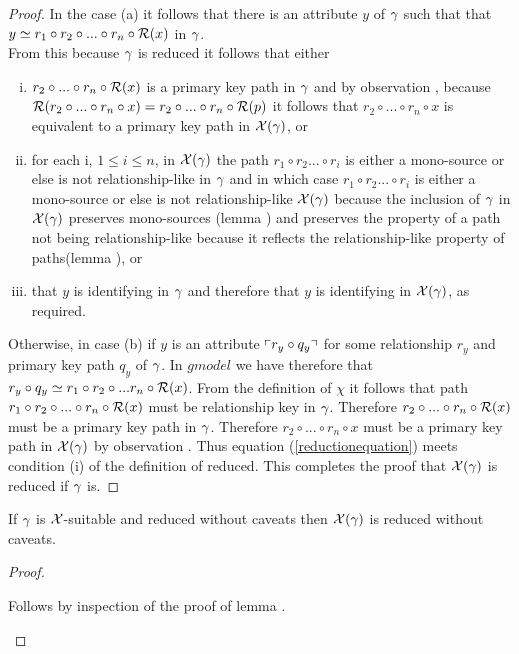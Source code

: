 \begin{proof}
In the case (a) it follows that there is an  attribute $y$ of $\gamma$ such that
that $y \simeq r_1 \circ r_2 \circ ... \circ r_n \circ \mathcal{R}(x)$ in $\gamma$. \\

From this because $\gamma$ is reduced it follows that either  
\begin{enumerate}[(i)]
\item $r_2 \circ ... \circ r_n \circ \mathcal{R}(x)$ is a primary key path in $\gamma$ and by observation , because $\mathcal{R}(r_2 \circ ... \circ r_n \circ x) = r_2 \circ ... \circ r_n \circ \mathcal{R}(p)$ it follows that $r_2 \circ ... \circ r_n \circ x$ is equivalent to a primary key path in $\mathcal{X}(\gamma)$, or 
\item for each i, $1 \leq i \leq n$, in $\mathcal{X}(\gamma)$ the path $r_1 \circ r_2 ... \circ r_i$ is either a mono-source or else is not relationship-like in $\gamma$
and in which case $r_1 \circ r_2 ... \circ r_i$ is either a mono-source or else is not relationship-like $\mathcal{X}(\gamma)$ because the inclusion of $\gamma$ in $\mathcal{X}(\gamma)$ 
preserves mono-sources (lemma ) and preserves the property of a path not being relationship-like because it reflects the relationship-like property of paths(lemma ), or
\item that $y$ is identifying in $\gamma$ and therefore that $y$ is identifying in $\mathcal{X}(\gamma)$, as required.
\end{enumerate}

Otherwise, in case (b) if $y$ is an attribute $\left\ulcorner r_y \circ q_y\right\urcorner$ for some relationship $r_y$ and primary key path $q_y$ of $\gamma$. 
In $gmodel$ we have therefore that $r_y \circ q_y \simeq r_1 \circ r_2 \circ ... r_n \circ \mathcal{R}(x)$. From the definition of $\chi$ it follows that path
$r_1 \circ r_2 \circ ... \circ r_n \circ \mathcal{R}(x)$ must be relationship key in $\gamma$. Therefore $r_2 \circ ... \circ r_n \circ \mathcal{R}(x)$ must be a primary
key path in $\gamma$. Therefore $r_2 \circ ... \circ r_n \circ x$ must be a primary key path in $\mathcal{X}(\gamma)$    by observation .
Thus equation (\ref{reductionequation}) meets condition (i) of the definition of reduced. This completes the proof that $\mathcal{X}(\gamma)$ is reduced if $\gamma$ is.
\end{proof}

\begin{lemma}
If $\gamma$ is $\mathcal{X}$-suitable and reduced without caveats then $\mathcal{X}(\gamma)$ is reduced without caveats.
\end{lemma}
\begin{proof}
\begin{newtt}Follows by inspection of the proof of lemma .\end{newtt}
\end{proof}



